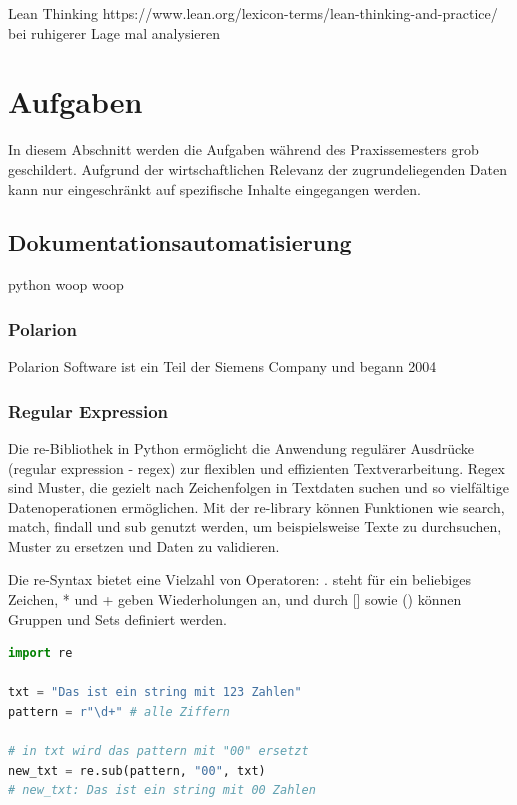 \documentclass[a4paper, 12pt]{article}
\begin{document}
Lean Thinking https://www.lean.org/lexicon-terms/lean-thinking-and-practice/
bei ruhigerer Lage mal analysieren %
 

\cite{scrum2020}


\newpage
\section{Aufgaben}\label{Aufgaben}
In diesem Abschnitt werden die Aufgaben während des Praxissemesters grob geschildert. Aufgrund der wirtschaftlichen Relevanz der zugrundeliegenden Daten kann nur eingeschränkt auf spezifische Inhalte eingegangen werden.

\subsection{Dokumentationsautomatisierung}\label{Dokumentationsautomatisierung}
python woop woop

\subsubsection{Polarion}\label{polarion}
Polarion Software ist ein Teil der Siemens Company und begann 2004

\subsubsection{Regular Expression}\label{regularExpression}
Die re-Bibliothek in Python ermöglicht die Anwendung regulärer Ausdrücke (regular expression - regex) zur flexiblen und effizienten Textverarbeitung. Regex sind Muster, die gezielt nach Zeichenfolgen in Textdaten suchen und so vielfältige Datenoperationen ermöglichen. Mit der re-library können Funktionen wie search, match, findall und sub genutzt werden, um beispielsweise Texte zu durchsuchen, Muster zu ersetzen und Daten zu validieren.

Die re-Syntax bietet eine Vielzahl von Operatoren: . steht für ein beliebiges Zeichen, * und + geben Wiederholungen an, und durch [] sowie () können Gruppen und Sets definiert werden.

\begin{lstlisting}[language=Python, caption=Beispiel für Python-Code]
import re

txt = "Das ist ein string mit 123 Zahlen"
pattern = r"\d+" # alle Ziffern

# in txt wird das pattern mit "00" ersetzt
new_txt = re.sub(pattern, "00", txt)
# new_txt: Das ist ein string mit 00 Zahlen
\end{lstlisting} %
\end{document}
